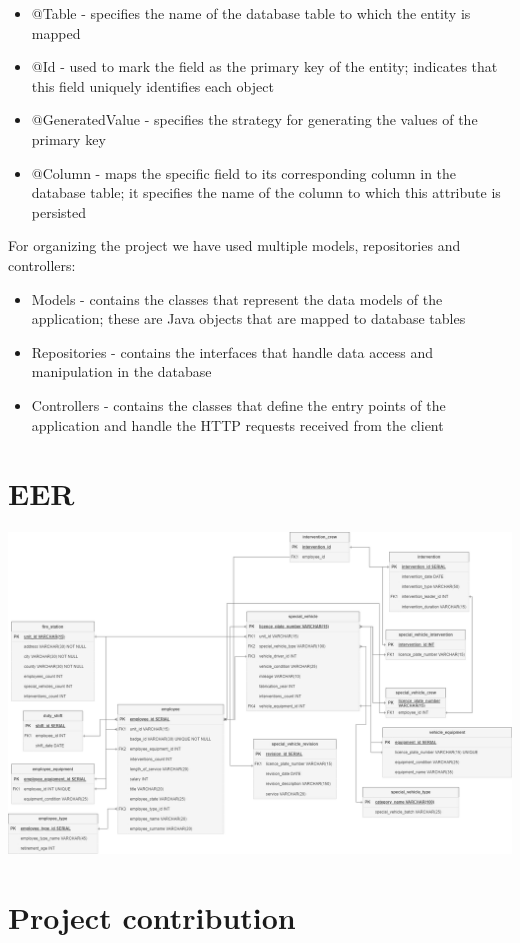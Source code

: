 \documentclass{article}
\begin{document}
\begin{itemize}
\begin{itemize}
        \item @Table - specifies the name of the database table to which the entity is mapped
        \item @Id - used to mark the field as the primary key of the entity; indicates that this field uniquely identifies each object
        \item @GeneratedValue - specifies the strategy for generating the values of the primary key
        \item @Column - maps the specific field to its corresponding column in the database table; it specifies the name of the column to which this attribute is persisted
    \end{itemize}
\end{itemize}
For organizing the project we have used multiple models, repositories and controllers:
\begin{itemize}
    \item Models - contains the classes that represent the data models of the application; these are Java objects that are mapped to database tables
    \item Repositories - contains the interfaces that handle data access and manipulation in the database
    \item Controllers - contains the classes that define the entry points of the application and handle the HTTP requests received from the client
\end{itemize}

\section{EER}
\includegraphics[scale=0.3]{EER.png}

\section{Project contribution}
\end{document}
